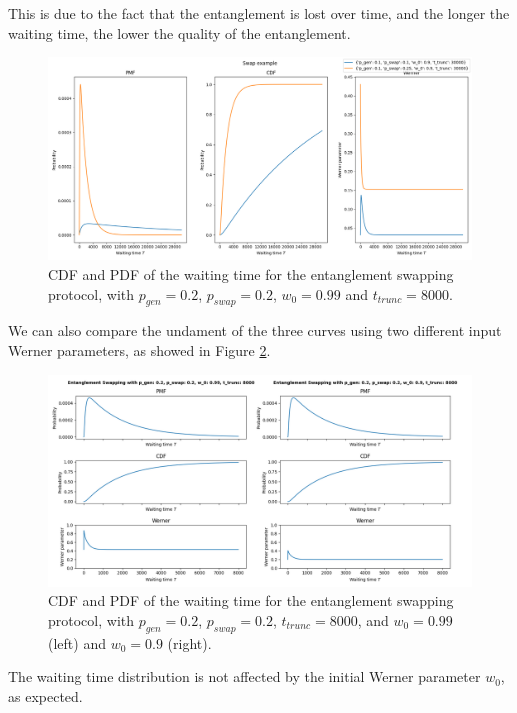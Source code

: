 \documentclass{masterthesis}
\begin{document}
This is due to the fact that the entanglement is lost over time, and the longer the waiting time, the lower the quality of the entanglement.
\begin{figure}[ht]
    \centering
    \includegraphics[width=1\linewidth]{images/swap_example_30000.png}
    \caption{CDF and PDF of the waiting time for the entanglement swapping protocol, with $p_{gen} = 0.2$, $p_{swap} = 0.2$, $w_0 = 0.99$ and $t_{trunc} = 8000$.}
    \label{fig:swap}
\end{figure}

We can also compare the undament of the three curves using two different input Werner parameters, as showed in Figure \ref{fig:swap_comparison}.

\begin{figure}[ht]
    \centering
    \includegraphics[width=1\linewidth]{images/swap_n3_comparison.png}
    \caption{CDF and PDF of the waiting time for the entanglement swapping protocol, with $p_{gen} = 0.2$, $p_{swap} = 0.2$, $t_{trunc} = 8000$, and $w_0 = 0.99$ (left) and $w_0 = 0.9$ (right).}
    \label{fig:swap_comparison}
\end{figure}

The waiting time distribution is not affected by the initial Werner parameter $w_0$, as expected.
\end{document}
